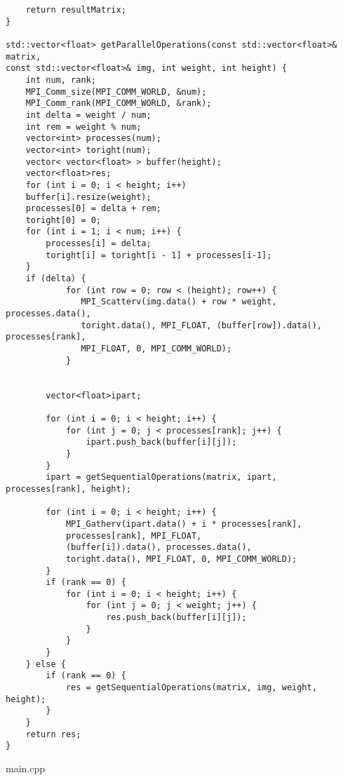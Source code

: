 \documentclass{report}
\begin{document}
\begin{lstlisting}
    return resultMatrix;
}

std::vector<float> getParallelOperations(const std::vector<float>& matrix,
const std::vector<float>& img, int weight, int height) {
    int num, rank;
    MPI_Comm_size(MPI_COMM_WORLD, &num);
    MPI_Comm_rank(MPI_COMM_WORLD, &rank);
    int delta = weight / num;
    int rem = weight % num;
    vector<int> processes(num);
    vector<int> toright(num);
    vector< vector<float> > buffer(height);
    vector<float>res;
    for (int i = 0; i < height; i++)
    buffer[i].resize(weight);
    processes[0] = delta + rem;
    toright[0] = 0;
    for (int i = 1; i < num; i++) {
        processes[i] = delta;
        toright[i] = toright[i - 1] + processes[i-1];
    }
    if (delta) {
            for (int row = 0; row < (height); row++) {
               MPI_Scatterv(img.data() + row * weight, processes.data(),
               toright.data(), MPI_FLOAT, (buffer[row]).data(), processes[rank],
               MPI_FLOAT, 0, MPI_COMM_WORLD);
            }


        vector<float>ipart;

        for (int i = 0; i < height; i++) {
            for (int j = 0; j < processes[rank]; j++) {
                ipart.push_back(buffer[i][j]);
            }
        }
        ipart = getSequentialOperations(matrix, ipart, processes[rank], height);

        for (int i = 0; i < height; i++) {
            MPI_Gatherv(ipart.data() + i * processes[rank],
            processes[rank], MPI_FLOAT,
            (buffer[i]).data(), processes.data(),
            toright.data(), MPI_FLOAT, 0, MPI_COMM_WORLD);
        }
        if (rank == 0) {
            for (int i = 0; i < height; i++) {
                for (int j = 0; j < weight; j++) {
                    res.push_back(buffer[i][j]);
                }
            }
        }
    } else {
        if (rank == 0) {
            res = getSequentialOperations(matrix, img, weight, height);
        }
    }
    return res;
}
\end{lstlisting}
main.cpp
\end{document}

